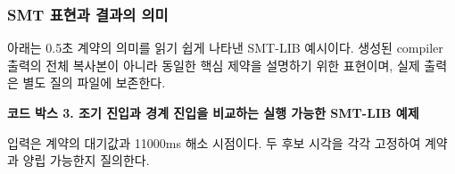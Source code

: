 \documentclass[10pt,a4paper,twocolumn]{article}\usepackage[margin=18mm]{geometry}\usepackage{fontspec,kotex}
\begin{document}
\subsubsection{SMT 표현과 결과의 의미}

아래는 0.5초 계약의 의미를 읽기 쉽게 나타낸 SMT-LIB 예시이다. 생성된 compiler 출력의 전체 복사본이 아니라 동일한 핵심 제약을 설명하기 위한 표현이며, 실제 출력은 별도 질의 파일에 보존한다.\par

\textbf{코드 박스 3. 조기 진입과 경계 진입을 비교하는 실행 가능한 SMT-LIB 예제}\par

입력은 계약의 대기값과 11000ms 해소 시점이다. 두 후보 시각을 각각 고정하여 계약과 양립 가능한지 질의한다.\par
\end{document}
